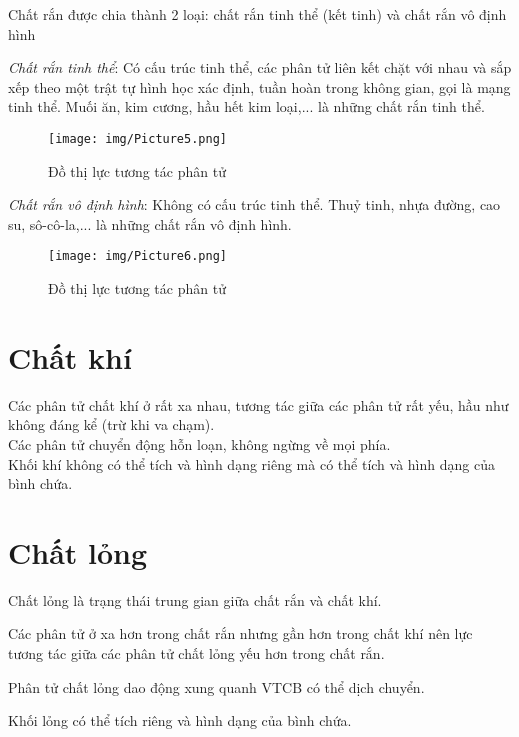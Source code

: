 \documentclass[a4paper, 12pt]{article}
\begin{document}
\noindent Chất rắn được chia thành 2 loại: chất rắn tinh thể (kết tinh) và chất rắn vô định hình

\textit{Chất rắn tinh thể}: Có cấu trúc tinh thể, các phân tử liên kết chặt với nhau và sắp xếp theo một trật tự hình học xác định, tuần hoàn trong không gian, gọi là mạng tinh thể. Muối ăn, kim  cương, hầu hết kim loại,... là những chất rắn tinh thể.

\begin{figure}[H]
	\centering
	\texttt{[image: img/Picture5.png]}
	\caption{Đồ thị lực tương tác phân tử}
\end{figure}

\textit{Chất rắn vô định hình}: Không có cấu trúc tinh thể. Thuỷ tinh, nhựa đường, cao su, sô-cô-la,... là những chất rắn vô định hình.

\begin{figure}[H]
	\centering
	\texttt{[image: img/Picture6.png]}
	\caption{Đồ thị lực tương tác phân tử}
\end{figure}

\section{Chất khí}
\raisebox{0.3ex}{\tiny$\bullet$} Các phân tử chất khí ở rất xa nhau, tương tác giữa các phân tử rất yếu, hầu như không đáng kể (trừ khi va chạm).\\
\raisebox{0.3ex}{\tiny$\bullet$} Các phân tử chuyển động hỗn loạn, không ngừng về mọi phía.\\
\raisebox{0.3ex}{\tiny$\bullet$} Khối khí không có thể tích và hình dạng riêng mà có thể tích và hình dạng của bình chứa.\\

\section{Chất lỏng}
Chất lỏng là trạng thái trung gian giữa chất rắn và chất khí.

\raisebox{0.3ex}{\tiny$\bullet$} Các phân tử ở xa hơn trong chất rắn nhưng gần hơn trong chất khí nên lực tương tác giữa các phân tử chất lỏng yếu hơn trong chất rắn.

\raisebox{0.3ex}{\tiny$\bullet$} Phân tử chất lỏng dao động xung quanh VTCB có thể dịch chuyển.

\raisebox{0.3ex}{\tiny$\bullet$} Khối lỏng có thể tích riêng và hình dạng của bình chứa.
\end{document}

